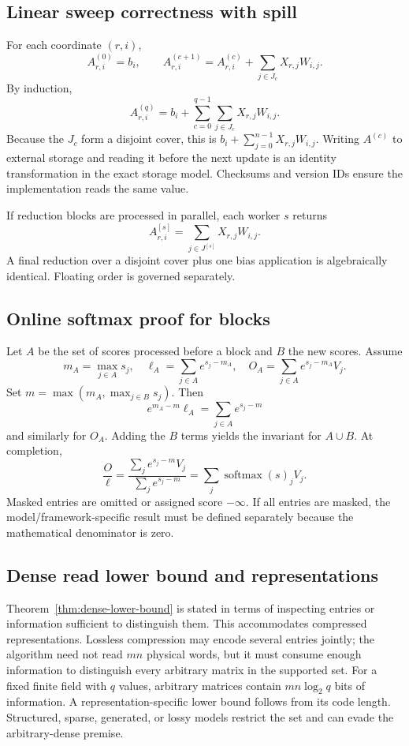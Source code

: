 \subsection{Linear sweep correctness with spill}

For each coordinate $(r,i)$,
\[
  A_{r,i}^{(0)}=b_i,
  \qquad
  A_{r,i}^{(c+1)}=A_{r,i}^{(c)}+
  \sum_{j\in J_c}X_{r,j}W_{i,j}.
\]
By induction,
\[
  A_{r,i}^{(q)}=b_i+
  \sum_{c=0}^{q-1}\sum_{j\in J_c}X_{r,j}W_{i,j}.
\]
Because the $J_c$ form a disjoint cover, this is $b_i+\sum_{j=0}^{n-1}X_{r,j}W_{i,j}$. Writing $A^{(c)}$ to external storage and reading it before the next update is an identity transformation in the exact storage model. Checksums and version IDs ensure the implementation reads the same value.

If reduction blocks are processed in parallel, each worker $s$ returns
\[
  A^{[s]}_{r,i}=\sum_{j\in J^{[s]}}X_{r,j}W_{i,j}.
\]
A final reduction over a disjoint cover plus one bias application is algebraically identical. Floating order is governed separately.

\subsection{Online softmax proof for blocks}

Let $A$ be the set of scores processed before a block and $B$ the new scores. Assume
\[
  m_A=\max_{j\in A}s_j,
  \quad \ell_A=\sum_{j\in A}e^{s_j-m_A},
  \quad O_A=\sum_{j\in A}e^{s_j-m_A}V_j.
\]
Set $m=\max(m_A,\max_{j\in B}s_j)$. Then
\[
  e^{m_A-m}\ell_A
  =\sum_{j\in A}e^{s_j-m}
\]
and similarly for $O_A$. Adding the $B$ terms yields the invariant for $A\cup B$. At completion,
\[
  \frac{O}{\ell}
  =\frac{\sum_j e^{s_j-m}V_j}{\sum_j e^{s_j-m}}
  =\sum_j\operatorname{softmax}(s)_jV_j.
\]
Masked entries are omitted or assigned score $-\infty$. If all entries are masked, the model/framework-specific result must be defined separately because the mathematical denominator is zero.

\subsection{Dense read lower bound and representations}

Theorem~\ref{thm:dense-lower-bound} is stated in terms of inspecting entries or information sufficient to distinguish them. This accommodates compressed representations. Lossless compression may encode several entries jointly; the algorithm need not read $mn$ physical words, but it must consume enough information to distinguish every arbitrary matrix in the supported set. For a fixed finite field with $q$ values, arbitrary matrices contain $mn\log_2q$ bits of information. A representation-specific lower bound follows from its code length. Structured, sparse, generated, or lossy models restrict the set and can evade the arbitrary-dense premise.

